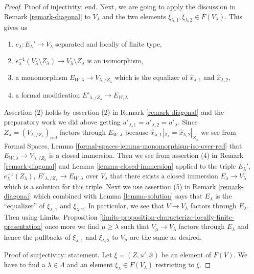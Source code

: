 \begin{proof}
\medskip\noindent
Proof of injectivity: end.
Next, we are going to apply the discussion in
Remark \ref{remark-diagonal} to $V_\lambda$ and the two elements
$\xi_{\lambda, 1}, \xi_{\lambda, 2} \in F(V_\lambda)$.
This gives us
\begin{enumerate}
\item $e_\lambda : E_\lambda' \to V_\lambda$
separated and locally of finite type,
\item $e_\lambda^{-1}(V_\lambda \setminus Z_\lambda) \to
V_\lambda \setminus Z_\lambda$ is an isomorphism,
\item a monomorphism $E_{W, \lambda} \to V_{\lambda, /Z_\lambda}$
which is the equalizer of $\hat x_{\lambda, 1}$ and $\hat x_{\lambda, 2}$,
\item a formal modification $E'_{\lambda, /Z_\lambda} \to E_{W, \lambda}$
\end{enumerate}
Assertion (2) holds by assertion (2) in Remark \ref{remark-diagonal}
and the preparatory work we did above getting
$u'_{\lambda, 1} = u'_{\lambda, 2} = u'_\lambda$.
Since $Z_\lambda = (V_{\lambda, /Z_\lambda})_{red}$ factors through
$E_{W, \lambda}$ because
$\hat x_{\lambda, 1}|_{Z_\lambda} = \hat x_{\lambda, 2}|_{Z_\lambda}$
we see from
Formal Spaces, Lemma \ref{formal-spaces-lemma-monomorphism-iso-over-red}
that $E_{W, \lambda} \to V_{\lambda, /Z_\lambda}$ is a closed immersion.
Then we see from assertion (4) in Remark \ref{remark-diagonal}
and Lemma \ref{lemma-closed-immersion} applied to the triple
$E_\lambda'$, $e_\lambda^{-1}(Z_\lambda)$,
$E'_{\lambda, /Z_\lambda} \to E_{W, \lambda}$ over $V_\lambda$ that
there exists a closed immersion $E_\lambda \to V_\lambda$
which is a solution for this triple.
Next we use assertion (5) in Remark \ref{remark-diagonal}
which combined with Lemma \ref{lemma-solution}
says that $E_\lambda$ is the ``equalizer'' of $\xi_{\lambda, 1}$
and $\xi_{\lambda, 2}$. In particular, we see that $V \to V_\lambda$
factors through $E_\lambda$. Then using Limits, Proposition
\ref{limits-proposition-characterize-locally-finite-presentation}
once more we find $\mu \geq \lambda$ such that $V_\mu \to V_\lambda$
factors through $E_\lambda$ and hence the pullbacks of
$\xi_{\lambda, 1}$ and $\xi_{\lambda, 2}$ to $V_\mu$ are the same
as desired.

\medskip\noindent
Proof of surjectivity: statement.
Let $\xi = (Z, u', \hat x)$ be an element of $F(V)$.
We have to find a $\lambda \in \Lambda$ and an element
$\xi_\lambda \in F(V_\lambda)$ restricting to $\xi$.


\end{proof}
